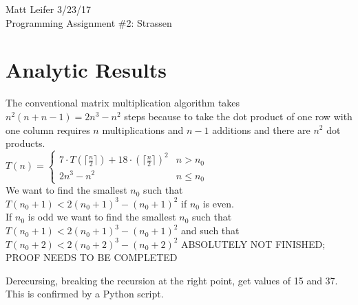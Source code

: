 \documentclass{article}
\begin{document}
	
\noindent Matt Leifer \hspace{5.5in} 3/23/17 \\
Programming Assignment \#2: Strassen \\

\section{Analytic Results}
The conventional matrix multiplication algorithm takes $n^2(n + n - 1) = 2n^3 - n^2$ steps because to take the dot product of one row with one column requires $n$ multiplications and $n - 1$ additions and there are $n^2$ dot products. \\
\noindent
$T(n) = 
\begin{cases}
7\cdot T(\lceil \frac{n}{2} \rceil) + 18 \cdot (\lceil \frac{n}{2} \rceil) ^ 2 & n > n_0 \\
2n^3-n^2 & n \leq n_0
\end{cases}
$
\\
We want to find the smallest $n_0$ such that $T(n_0 + 1) < 2(n_0+1)^3-(n_0+1)^2$ if $n_0$ is even.  \\
If $n_0$ is odd we want to find the smallest $n_0$ such that $T(n_0 + 1) < 2(n_0+1)^3-(n_0+1)^2$ and such that $T(n_0 + 2) < 2(n_0+2)^3-(n_0+2)^2$ \huge{ABSOLUTELY NOT FINISHED; PROOF NEEDS TO BE COMPLETED} \normalsize 

Derecursing, breaking the recursion at the right point, get values of 15 and 37. This is confirmed by a Python script.
\end{document}
